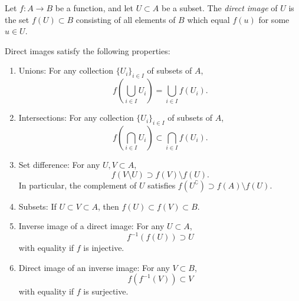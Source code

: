 \documentclass{article}
\begin{document}
Let $f\colon A \longrightarrow B$ be a function, and let $U \subset A$ be a subset. The {\em direct image} of $U$ is the set $f(U) \subset B$ consisting of all elements of $B$ which equal $f(u)$ for some $u \in U$.

Direct images satisfy the following properties:

\begin{enumerate}
\item Unions: For any collection $\{U_i\}_{i \in I}$ of subsets of $A$,
$$
f\left(\bigcup_{i \in I} U_i\right) = \bigcup_{i\in I} f(U_i).
$$
\item Intersections: For any collection $\{U_i\}_{i \in I}$ of subsets of $A$,
$$
f\left(\bigcap_{i \in I} U_i\right) \subset \bigcap_{i\in I} f(U_i).
$$
\item Set difference: For any $U,V \subset A$,
$$
f(V \setminus U) \supset f(V) \setminus f(U).
$$
In particular, the complement of $U$ satisfies $f(U^\complement) \supset f(A) \setminus f(U)$.
\item Subsets: If $U \subset V \subset A$, then $f(U) \subset f(V) \subset B$.
\item Inverse image of a direct image: For any $U \subset A$,
$$f^{-1}(f(U)) \supset U$$
with equality if $f$ is injective.
\item Direct image of an inverse image: For any $V \subset B$,
$$f(f^{-1}(V)) \subset V$$
with equality if $f$ is surjective.
\end{enumerate}
\end{document}
